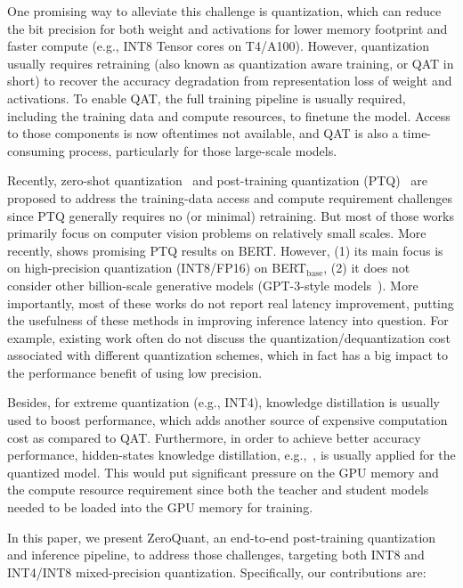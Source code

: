 One promising way to alleviate this challenge is quantization, which can reduce the bit precision for both weight and activations for lower memory footprint and faster compute (e.g., INT8 Tensor cores on T4/A100). However, quantization usually requires retraining (also known as quantization aware training, or QAT in short) to recover the accuracy degradation from representation loss of weight and activations. To enable QAT, the full training pipeline is usually required, including the training data and compute resources, to finetune the model. Access to those components is now oftentimes not available, and QAT is also a time-consuming process, particularly for those large-scale models.

Recently, zero-shot quantization~\cite{cai2020zeroq,nagel2019data} and post-training quantization (PTQ)~\cite{nagel2020up,liu2021post} are proposed to address the training-data access and compute  requirement challenges since PTQ generally requires no (or minimal) retraining. But most of those works primarily focus on computer vision problems on relatively small scales. More recently, \cite{bondarenko2021understanding} shows promising PTQ results on BERT. However, (1) its main focus is on high-precision quantization (INT8/FP16) on BERT$_\text{base}$, (2) it does not consider other billion-scale generative models (GPT-3-style models~\cite{brown2020language}). More importantly, most of these works do not report real latency improvement, putting the usefulness of these methods in improving inference latency into question. For example, existing work often do not discuss the quantization/dequantization cost associated with different quantization schemes, which in fact has a big impact to the performance benefit of using low precision. 

Besides, for extreme quantization (e.g., INT4), knowledge distillation is usually used to boost performance, which adds another source of expensive computation cost as compared to QAT. Furthermore, in order to achieve better accuracy performance, hidden-states knowledge distillation, e.g.,~\cite{bai2020binarybert,zhang2020ternarybert}, is usually applied for the quantized model. This would put significant pressure on the GPU memory and the compute resource requirement since both the teacher and student models needed to be loaded into the GPU memory for training. 

In this paper, we present ZeroQuant, an end-to-end post-training quantization and inference pipeline, to address those challenges, targeting both INT8 and INT4/INT8 mixed-precision quantization. Specifically, our contributions are:

